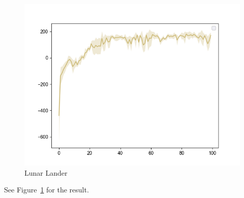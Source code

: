 \begin{figure}[htbp]
      \centering
      \includegraphics[width=0.5\linewidth]{figures/p6.png}
      \caption{Lunar Lander}
      \label{fig:p6}
\end{figure}
See Figure~\ref{fig:p6} for the result.
